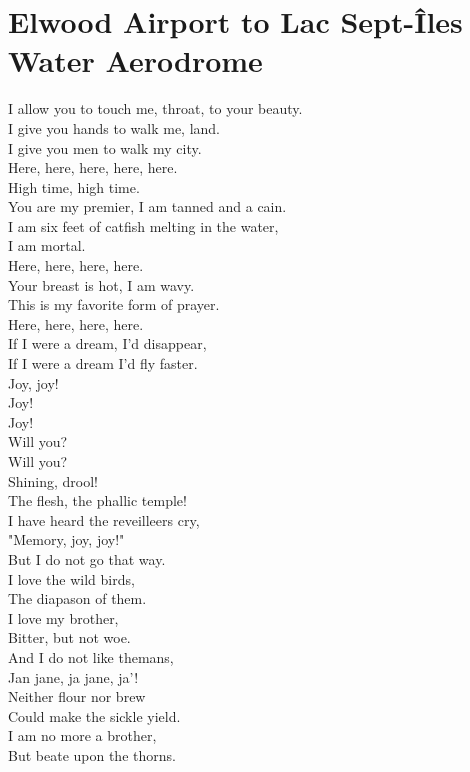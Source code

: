 \documentclass[smalldemyvopaper,11pt,twoside,onecolumn,openright,extrafontsizes]{memoir}
\begin{document}
\chapter{Elwood Airport to Lac Sept-Îles Water Aerodrome}
I allow you to touch me, throat, to your beauty.
\\I give you hands to walk me, land.
\\I give you men to walk my city.
\\Here, here, here, here, here.
\\High time, high time.
\\You are my premier, I am tanned and a cain.
\\I am six feet of catfish melting in the water,
\\I am mortal.
\\Here, here, here, here.
\\Your breast is hot, I am wavy.
\\This is my favorite form of prayer.
\\Here, here, here, here.
\\If I were a dream, I'd disappear,
\\If I were a dream I'd fly faster.
\\Joy, joy!
\\Joy!
\\Joy!
\\Will you?
\\Will you?
\\Shining, drool!
\\The flesh, the phallic temple!
\\I have heard the reveilleers cry,
\\"Memory, joy, joy!"
\\But I do not go that way.
\\I love the wild birds,
\\The diapason of them.
\\I love my brother,
\\Bitter, but not woe.
\\And I do not like themans,
\\Jan jane, ja jane, ja'!
\\Neither flour nor brew
\\Could make the sickle yield.
\\I am no more a brother,
\\But beate upon the thorns.
\end{document}

